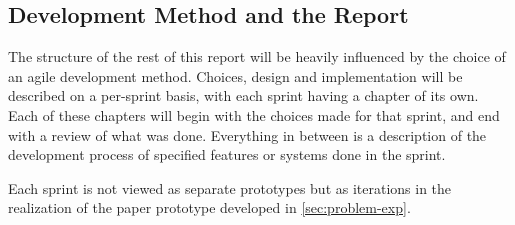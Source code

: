 \subsection{Development Method and the Report}
The structure of the rest of this report will be heavily influenced by the choice of an agile development method. Choices, design and implementation will be described on a per-sprint basis, with each sprint having a chapter of its own. Each of these chapters will begin with the choices made for that sprint, and end with a review of what was done. Everything in between is a description of the development process of specified features or systems done in the sprint.

Each sprint is not viewed as separate prototypes but as iterations in the realization of the paper prototype developed in \autoref{sec:problem-exp}.
